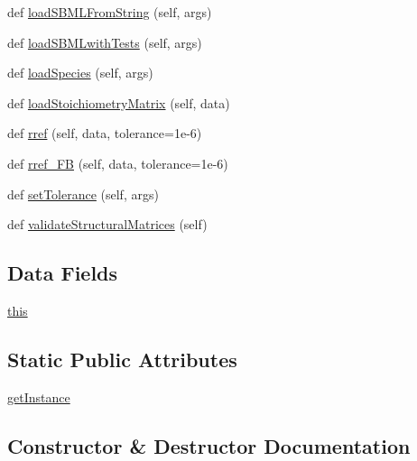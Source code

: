 \begin{DoxyCompactItemize}
\item 
def \hyperlink{classstructural_1_1_lib_structural_ab6dc1f23f41dd7a8792424e5dea84118}{load\+S\+B\+M\+L\+From\+String} (self, args)
\item 
def \hyperlink{classstructural_1_1_lib_structural_a90bc3469be1bdd28fd6abfa7f785e6bb}{load\+S\+B\+M\+Lwith\+Tests} (self, args)
\item 
def \hyperlink{classstructural_1_1_lib_structural_a9a7f50e152001a957f4ea3b1602cea35}{load\+Species} (self, args)
\item 
def \hyperlink{classstructural_1_1_lib_structural_a5875884a8fea48cfeef7ec698074740e}{load\+Stoichiometry\+Matrix} (self, data)
\item 
def \hyperlink{classstructural_1_1_lib_structural_a525d643a21c9f307ffd523d0e7566d60}{rref} (self, data, tolerance=1e-\/6)
\item 
def \hyperlink{classstructural_1_1_lib_structural_a31b9cedacf51b2c1078cd333663c5393}{rref\+\_\+\+FB} (self, data, tolerance=1e-\/6)
\item 
def \hyperlink{classstructural_1_1_lib_structural_af571394fbfeed45a086769480a063d17}{set\+Tolerance} (self, args)
\item 
def \hyperlink{classstructural_1_1_lib_structural_a614ad2698b1670c3e80f9bb4f8a2b360}{validate\+Structural\+Matrices} (self)
\end{DoxyCompactItemize}
\subsection*{Data Fields}
\begin{DoxyCompactItemize}
\item 
\hyperlink{classstructural_1_1_lib_structural_a39f5f3d0de7f25edb2b11a29895084b4}{this}
\end{DoxyCompactItemize}
\subsection*{Static Public Attributes}
\begin{DoxyCompactItemize}
\item 
\hyperlink{classstructural_1_1_lib_structural_a38ac860d8780feb19378bf83cdedd4d1}{get\+Instance}
\end{DoxyCompactItemize}


\subsection{Constructor \& Destructor Documentation}
\mbox{\label{classstructural_1_1_lib_structural_aabd4602d9b1d177b4177eec4c3ab81f6}} 

